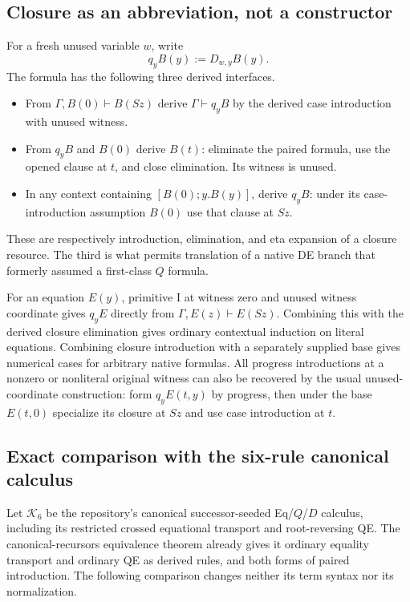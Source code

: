 \documentclass[11pt,letterpaper]{article}
\theoremstyle{definition}\newtheorem{definition}[theorem]{Definition}
\begin{document}
\subsection{Closure as an abbreviation, not a constructor}

For a fresh unused variable $w$, write
\[
 q_yB(y):=D_{w,y}B(y).
\]
The formula has the following three derived interfaces.
\begin{itemize}
\item From $\Gamma,B(0)\vdash B(Sz)$ derive $\Gamma\vdash q_yB$ by
the derived case introduction with unused witness.
\item From $q_yB$ and $B(0)$ derive $B(t)$: eliminate the paired formula,
use the opened clause at $t$, and close elimination. Its witness is unused.
\item In any context containing $[B(0);y.B(y)]$, derive $q_yB$: under
its case-introduction assumption $B(0)$ use that clause at $Sz$.
\end{itemize}
These are respectively introduction, elimination, and eta expansion of a
closure resource. The third is what permits translation of a native DE
branch that formerly assumed a first-class $Q$ formula.

For an equation $E(y)$, primitive I at witness zero and unused witness
coordinate gives $q_yE$ directly from
$\Gamma,E(z)\vdash E(Sz)$. Combining this with the derived closure
elimination gives ordinary contextual induction on literal equations.
Combining closure introduction with a separately supplied base gives
numerical cases for arbitrary native formulas. All progress introductions
at a nonzero or nonliteral original witness can also be recovered by the
usual unused-coordinate construction: form $q_yE(t,y)$ by progress, then
under the base $E(t,0)$ specialize its closure at $Sz$ and use case
introduction at $t$.

\subsection{Exact comparison with the six-rule canonical calculus}

Let $\mathcal K_6$ be the repository's canonical successor-seeded Eq/$Q$/$D$
calculus, including its restricted crossed equational transport and
root-reversing QE. The canonical-recursors equivalence theorem already
gives it ordinary equality transport and ordinary QE as derived rules,
and both forms of paired introduction. The following comparison changes
neither its term syntax nor its normalization.
\end{document}
